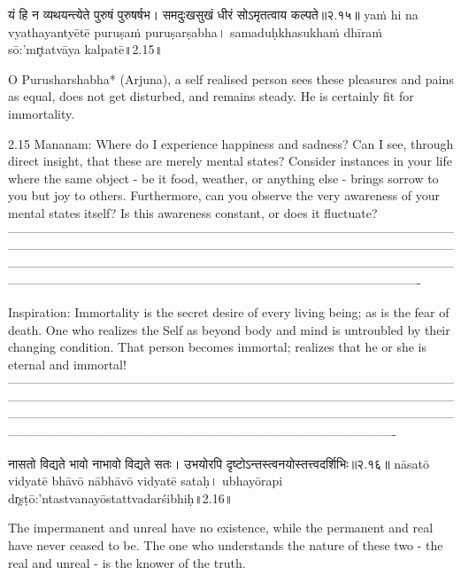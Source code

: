 यं हि न व्यथयन्त्येते पुरुषं पुरुषर्षभ। 
समदुःखसुखं धीरं सोऽमृतत्वाय कल्पते॥२.१५॥
yaṁ hi na vyathayantyētē puruṣaṁ puruṣarṣabha। 
samaduḥkhasukhaṁ dhīraṁ sō:'mr̥tatvāya kalpatē॥2.15॥

O Purusharshabha* (Arjuna), a self realised person sees these pleasures and pains as equal, does not get disturbed, and remains steady. He is certainly fit for immortality.

2.15 Mananam:
Where do I experience happiness and sadness? Can I see, through direct insight, that these are merely mental states? Consider instances in your life where the same object - be it food, weather, or anything else - brings sorrow to you but joy to others. Furthermore, can you observe the very awareness of your mental states itself? Is this awareness constant, or does it fluctuate? 
—-------------------------------------------------------------------------------------------------------------------------------------------------------------------------------------------------------------------------------------------------------------------------------------------------------------------------------------------------------------------------------------------------------------------------------------
 
Inspiration:
Immortality is the secret desire of every living being; as is the fear of death. One who realizes the Self as beyond body and mind is untroubled by their changing condition. That person becomes immortal; realizes that he or she is eternal and immortal!  
—-------------------------------------------------------------------------------------------------------------------------------------------------------------------------------------------------------------------------------------------------------------------------------------------------------------------------------------------------------------------------------------------------------------------------------


नासतो विद्यते भावो नाभावो विद्यते सतः। 
उभयोरपि दृष्टोऽन्तस्त्वनयोस्तत्त्वदर्शिभिः॥२.१६॥
nāsatō vidyatē bhāvō nābhāvō vidyatē sataḥ। 
ubhayōrapi dr̥ṣṭō:'ntastvanayōstattvadarśibhiḥ॥2.16॥

The impermanent and unreal have no existence, while the permanent and real have never ceased to be. The one who understands the nature of these two - the real and unreal - is the knower of the truth.

